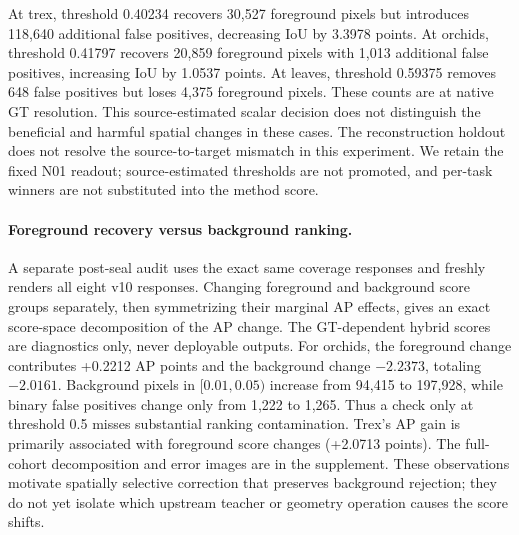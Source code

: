 At trex, threshold 0.40234 recovers 30,527 foreground pixels but introduces
118,640 additional false positives, decreasing IoU by 3.3978 points. At orchids,
threshold 0.41797 recovers 20,859 foreground pixels with 1,013 additional false
positives, increasing IoU by 1.0537 points. At leaves, threshold 0.59375 removes
648 false positives but loses 4,375 foreground pixels. These counts are at native
GT resolution. This source-estimated scalar decision does not distinguish the
beneficial and harmful spatial changes in these cases. The reconstruction holdout does
not resolve the source-to-target mismatch in this experiment. We retain the
fixed N01 readout; source-estimated thresholds are not promoted, and per-task
winners are not substituted into the method score.

\paragraph{Foreground recovery versus background ranking.}
A separate post-seal audit uses the exact same coverage responses and freshly
renders all eight v10 responses. Changing foreground and background score groups
separately, then symmetrizing their marginal AP effects, gives an exact
score-space decomposition of the AP change. The GT-dependent hybrid scores are
diagnostics only, never deployable outputs. For orchids, the foreground change
contributes +0.2212 AP points and the background change $-2.2373$, totaling
$-2.0161$. Background pixels in $[0.01,0.05)$ increase from 94,415 to 197,928,
while binary false positives change only from 1,222 to 1,265. Thus a check only
at threshold 0.5 misses substantial ranking contamination. Trex's AP gain is
primarily associated with foreground score changes (+2.0713 points).
The full-cohort decomposition and error images are in the supplement. These
observations motivate spatially selective correction that preserves background
rejection; they do not yet isolate which upstream teacher or geometry operation
causes the score shifts.
